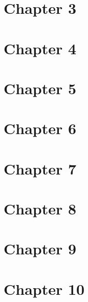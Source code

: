 \documentclass[11pt, oneside]{article}   	%
\begin{document}
\section*{Chapter 3}
\section*{Chapter 4}
\section*{Chapter 5}
\section*{Chapter 6}
\section*{Chapter 7}
\section*{Chapter 8}
\section*{Chapter 9}
\section*{Chapter 10}
\end{document}
